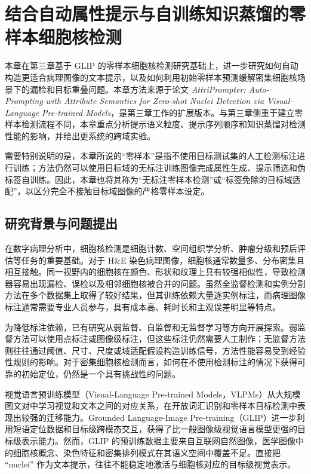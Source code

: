 \chapter{结合自动属性提示与自训练知识蒸馏的零样本细胞核检测}

本章在第三章基于 GLIP 的零样本细胞核检测研究基础上，进一步研究如何自动构造更适合病理图像的文本提示，以及如何利用初始零样本预测缓解密集细胞核场景下的漏检和目标重叠问题。本章方法来源于论文 \emph{AttriPrompter: Auto-Prompting with Attribute Semantics for Zero-shot Nuclei Detection via Visual-Language Pre-trained Models}，是第三章工作的扩展版本。与第三章侧重于建立零样本检测流程不同，本章重点分析提示语义粒度、提示序列顺序和知识蒸馏对检测性能的影响，并给出更系统的跨域实验。

需要特别说明的是，本章所说的“零样本”是指不使用目标测试集的人工检测标注进行训练；方法仍然可以使用目标域的无标注训练图像完成属性生成、提示筛选和伪标签自训练。因此，本章也将其称为“无标注零样本检测”或“标签免除的目标域适配”，以区分完全不接触目标域图像的严格零样本设定。

\section{研究背景与问题提出}

在数字病理分析中，细胞核检测是细胞计数、空间组织学分析、肿瘤分级和预后评估等任务的重要基础。对于 H\&E 染色病理图像，细胞核通常数量多、分布密集且相互接触。同一视野内的细胞核在颜色、形状和纹理上具有较强相似性，导致检测器容易出现漏检、误检以及相邻细胞核被合并的问题。虽然全监督检测和实例分割方法在多个数据集上取得了较好结果，但其训练依赖大量逐实例标注，而病理图像标注通常需要专业人员参与，具有成本高、耗时长和主观误差明显等特点。

为降低标注依赖，已有研究从弱监督、自监督和无监督学习等方向开展探索。弱监督方法可以使用点标注或图像级标注，但这些标注仍然需要人工制作；无监督方法则往往通过阈值、尺寸、尺度或域适配假设构造训练信号，方法性能容易受到经验性规则的影响。对于密集细胞核检测而言，如何在不使用检测标注的情况下获得可靠的初始定位，仍然是一个具有挑战性的问题。

视觉语言预训练模型（Visual-Language Pre-trained Models，VLPMs）从大规模图文对中学习视觉和文本之间的对应关系，在开放词汇识别和零样本目标检测中表现出较强的迁移能力。Grounded Language-Image Pre-training（GLIP）进一步利用短语定位数据和目标级跨模态交互，获得了比一般图像级视觉语言模型更强的目标级表示能力。然而，GLIP 的预训练数据主要来自互联网自然图像，医学图像中的细胞核概念、染色特征和密集排列模式在其语义空间中覆盖不足。直接把 ``nuclei'' 作为文本提示，往往不能稳定地激活与细胞核对应的目标级视觉表示。

